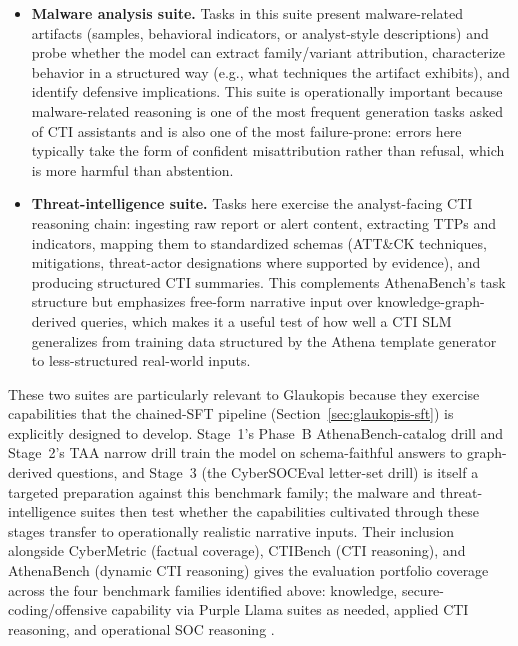 \documentclass[unnumsec,webpdf,contemporary,large]{oup-authoring-template}
\theoremstyle{thmstyleone}
\theoremstyle{thmstyletwo}
\theoremstyle{thmstylethree}
\begin{document}
\begin{itemize}
  \item \textbf{Malware analysis suite.} Tasks in this suite present malware-related artifacts (samples, behavioral indicators, or analyst-style descriptions) and probe whether the model can extract family/variant attribution, characterize behavior in a structured way (e.g., what techniques the artifact exhibits), and identify defensive implications. This suite is operationally important because malware-related reasoning is one of the most frequent generation tasks asked of CTI assistants and is also one of the most failure-prone: errors here typically take the form of confident misattribution rather than refusal, which is more harmful than abstention.
  \item \textbf{Threat-intelligence suite.} Tasks here exercise the analyst-facing CTI reasoning chain: ingesting raw report or alert content, extracting TTPs and indicators, mapping them to standardized schemas (ATT\&CK techniques, mitigations, threat-actor designations where supported by evidence), and producing structured CTI summaries. This complements AthenaBench's task structure but emphasizes free-form narrative input over knowledge-graph-derived queries, which makes it a useful test of how well a CTI SLM generalizes from training data structured by the Athena template generator to less-structured real-world inputs.
\end{itemize}

These two suites are particularly relevant to Glaukopis because they exercise capabilities that the chained-SFT pipeline (Section~\ref{sec:glaukopis-sft}) is explicitly designed to develop. Stage~1's Phase~B AthenaBench-catalog drill and Stage~2's TAA narrow drill train the model on schema-faithful answers to graph-derived questions, and Stage~3 (the CyberSOCEval letter-set drill) is itself a targeted preparation against this benchmark family; the malware and threat-intelligence suites then test whether the capabilities cultivated through these stages transfer to operationally realistic narrative inputs. Their inclusion alongside CyberMetric (factual coverage), CTIBench (CTI reasoning), and AthenaBench (dynamic CTI reasoning) gives the evaluation portfolio coverage across the four benchmark families identified above: knowledge, secure-coding/offensive capability via Purple Llama suites as needed, applied CTI reasoning, and operational SOC reasoning \cite{tihanyi2024cybermetric,alam2024ctibench,alam2025athenabench,bhatt2023purplellama,bhatt2024cyberseceval2,cybersoceval2025}.
\end{document}
